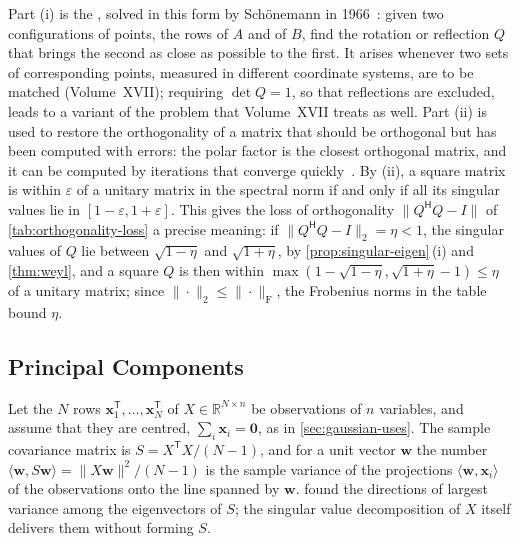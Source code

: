 Part (i) is the , solved in this form by Sch\"onemann in 1966~\cite{schonemann1966}: given two configurations of points, the rows of $A$ and of $B$, find the rotation or reflection $Q$ that brings the second as close as possible to the first. It arises whenever two sets of corresponding points, measured in different coordinate systems, are to be matched (Volume~XVII); requiring $\det Q=1$, so that reflections are excluded, leads to a variant of the problem that Volume~XVII treats as well. Part (ii) is used to restore the orthogonality of a matrix that should be orthogonal but has been computed with errors: the polar factor is the closest orthogonal matrix, and it can be computed by iterations that converge quickly~\cite{higham2008}. By (ii), a square matrix is within $\varepsilon$ of a unitary matrix in the spectral norm if and only if all its singular values lie in $[1-\varepsilon,1+\varepsilon]$. This gives the loss of orthogonality $\|Q^{\mathsf H}Q-I\|$ of \cref{tab:orthogonality-loss} a precise meaning: if $\|Q^{\mathsf H}Q-I\|_2=\eta<1$, the singular values of $Q$ lie between $\sqrt{1-\eta}$ and $\sqrt{1+\eta}$, by \cref{prop:singular-eigen}\,(i) and \cref{thm:weyl}, and a square $Q$ is then within $\max(1-\sqrt{1-\eta},\sqrt{1+\eta}-1)\le\eta$ of a unitary matrix; since $\|\cdot\|_2\le\|\cdot\|_{\mathrm F}$, the Frobenius norms in the table bound $\eta$.

\subsection{Principal Components}

Let the $N$ rows $\mathbf x_1^{\mathsf T},\ldots,\mathbf x_N^{\mathsf T}$ of $X\in\mathbb R^{N\times n}$ be observations of $n$ variables, and assume that they are centred, $\sum_i\mathbf x_i=\mathbf 0$, as in \cref{sec:gaussian-uses}. The sample covariance matrix is $S=X^{\mathsf T}X/(N-1)$, and for a unit vector $\mathbf w$ the number $\langle\mathbf w,S\mathbf w\rangle=\|X\mathbf w\|^2/(N-1)$ is the sample variance of the projections $\langle\mathbf w,\mathbf x_i\rangle$ of the observations onto the line spanned by $\mathbf w$.  found the directions of largest variance among the eigenvectors of $S$; the singular value decomposition of $X$ itself delivers them without forming $S$.


